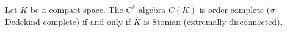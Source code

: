 Let $K$ be a compact space. The $C^*$-algebra $C(K)$ is order complete ($\sigma$-Dedekind complete) if and only if $K$ is Stonian (extremally disconnected).
